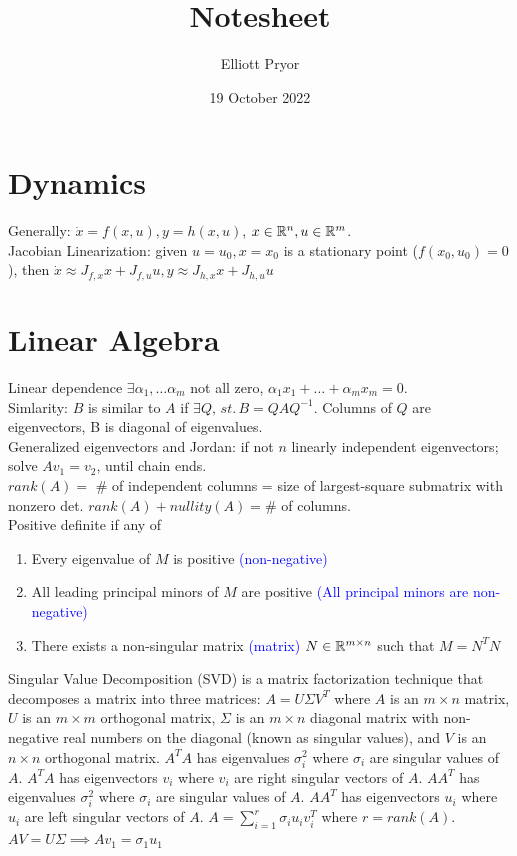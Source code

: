 \documentclass[11pt]{article}
\title{Notesheet}
\author{Elliott Pryor}
\date{19 October 2022}
\begin{document}

\section{Dynamics}
Generally: $\dot{x} = f(x,u), y = h(x,u)$, $x \in \mathbb{R}^n, u \in \mathbb{R}^m$.\\
Jacobian Linearization: given $u = u_0, x=x_0$ is a stationary point ($f(x_0, u_0) = 0$),
then $\dot{x} \approx J_{f,x}x + J_{f,u}u, y \approx J_{h,x}x + J_{h,u}u$ \\


\section{Linear Algebra}
Linear dependence $\exists \alpha_1, \dots \alpha_m$ not all zero, $\alpha_1 x_1 + \dots + \alpha_m x_m = 0$.\\
Simlarity: $B$ is similar to $A$ if $\exists Q, \, st. \, B = QAQ^{-1}$.
Columns of $Q$ are eigenvectors, B is diagonal of eigenvalues.\\
Generalized eigenvectors and Jordan: if not $n$ linearly independent eigenvectors;
solve $Av_1 = v_2$, until chain ends. \\
$rank(A) = $ \# of independent columns = size of largest-square submatrix with nonzero det.
$rank(A) + nullity(A) = $\# of columns. \\
Positive definite if any of \begin{enumerate}
    \item Every eigenvalue of $M$ is positive \textcolor{blue}{(non-negative)}
    \item All leading principal minors of $M$ are positive \textcolor{blue}{(All principal minors are non-negative)}
    \item There exists a non-singular matrix \textcolor{blue}{(matrix)} $N \in \mathbb{R}^{m\times n}$ such that $M = N^TN$
\end{enumerate}
Singular Value Decomposition (SVD) is a matrix factorization technique that decomposes a matrix into three matrices:
$A = U \Sigma V^T$
where $A$ is an $m \times n$ matrix, $U$ is an $m \times m$ orthogonal matrix, 
$\Sigma$ is an $m \times n$ diagonal matrix with non-negative real numbers on the diagonal (known as singular values),
and $V$ is an $n \times n$ orthogonal matrix.
$A^TA$ has eigenvalues $\sigma_i^2$ where $\sigma_i$ are singular values of $A$.
$A^TA$ has eigenvectors $v_i$ where $v_i$ are right singular vectors of $A$.
$AA^T$ has eigenvalues $\sigma_i^2$ where $\sigma_i$ are singular values of $A$.
$AA^T$ has eigenvectors $u_i$ where $u_i$ are left singular vectors of $A$.
$A = \sum_{i=1}^r \sigma_i u_i v_i^T$ where $r = rank(A)$.
$AV = U\Sigma \implies Av_1 = \sigma_1 u_1$\\
\end{document}
